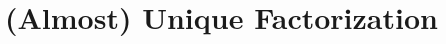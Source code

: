 \documentclass[../notes.tex]{subfiles}
\begin{document}
\section{(Almost) Unique Factorization}
\end{document}

